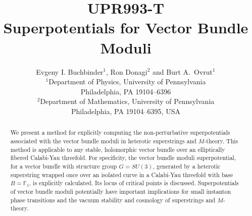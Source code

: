 \documentclass[a4paper,12pt]{article}
\numberwithin{equation}{section}
\newcommand{\ns}{\normalsize}
\theoremstyle{plain}
\begin{document}

\begin{titlepage}

\vspace{-5cm}

\title{
   \hfill{\ns UPR993-T} \\[1em]
   {\LARGE Superpotentials for Vector Bundle Moduli}
\\
[1em] }
\author{
   Evgeny I. Buchbinder$^1$, Ron Donagi$^2$ and
Burt A.~Ovrut$^1$ \\[0.5em]
   {\ns $^1$Department of Physics, University of Pennsylvania} \\[-0.4em]
   {\ns Philadelphia, PA 19104--6396}\\
   {\ns $^2$Department of Mathematics, University of Pennsylvania}
   \\[-0.4em]
   {\ns Philadelphia, PA 19104--6395, USA}\\}

\date{}

\maketitle

\begin{abstract}

We present a method for explicitly computing the non-perturbative
superpotentials associated with the vector bundle moduli in heterotic
superstrings
and $M$-theory. This method is applicable to any stable,
holomorphic vector bundle over an elliptically fibered Calabi-Yau
threefold.
For specificity, the vector bundle moduli superpotential, for a vector
bundle with
structure group $G=SU(3)$, generated by a heterotic
superstring wrapped once over an isolated curve in a Calabi-Yau threefold
with
base $B={\mathbb F}_{1}$, is explicitly calculated. Its locus of critical
points is discussed. Superpotentials of vector bundle moduli potentially
have
important implications for small instanton phase transitions and the
vacuum
stability and cosmology of superstrings and $M$-theory.


\end{abstract}

\thispagestyle{empty}

\end{titlepage}

\end{document}
